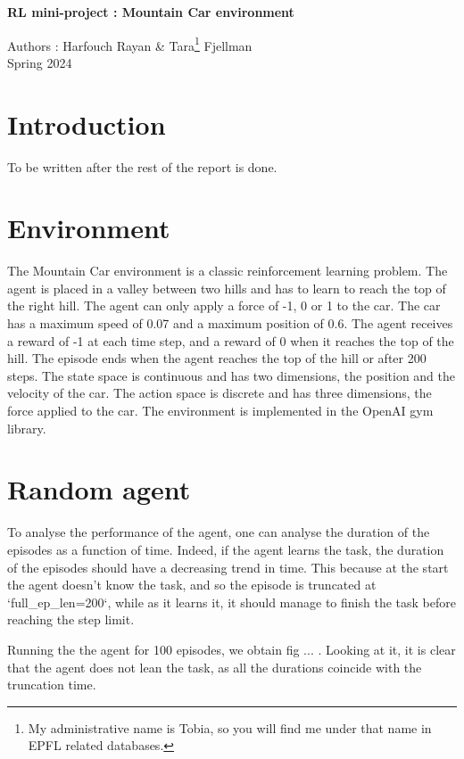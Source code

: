 \documentclass[a4paper, 12pt,oneside]{article}
\begin{document}
 
	\begin{center}
	    \Large
	    \textbf{RL mini-project : Mountain Car environment}
	        
	    \vspace{0.4cm}
	    \large
	    Authors : Harfouch Rayan \& Tara\footnote[1]{My administrative name is Tobia, so you will find me under that name in EPFL related databases.} Fjellman \\
	    \small{Spring 2024}
	\end{center}

    \section{Introduction}
        To be written after the rest of the report is done.

    \section{Environment}
        The Mountain Car environment is a classic reinforcement learning problem. The agent is placed in a valley between two hills and has to learn to reach the top of the right hill. The agent can only apply a force of -1, 0 or 1 to the car. The car has a maximum speed of 0.07 and a maximum position of 0.6. The agent receives a reward of -1 at each time step, and a reward of 0 when it reaches the top of the hill. The episode ends when the agent reaches the top of the hill or after 200 steps. The state space is continuous and has two dimensions, the position and the velocity of the car. The action space is discrete and has three dimensions, the force applied to the car. The environment is implemented in the OpenAI gym library.
    \section{Random agent}
    To analyse the performance of the agent, one can analyse the duration of the episodes as a function of time. Indeed, if the agent learns the task, the duration of the episodes should have a decreasing trend in time. This because at the start the agent doesn't know the task, and so the episode is truncated at `full\_ep\_len=200`, while as it learns it, it should manage to finish the task before reaching the step limit. 
    
    Running the the agent for 100 episodes, we obtain fig ... . Looking at it, it is clear that the agent does not lean the task, as all the durations coincide with the truncation time. 
\end{document}
